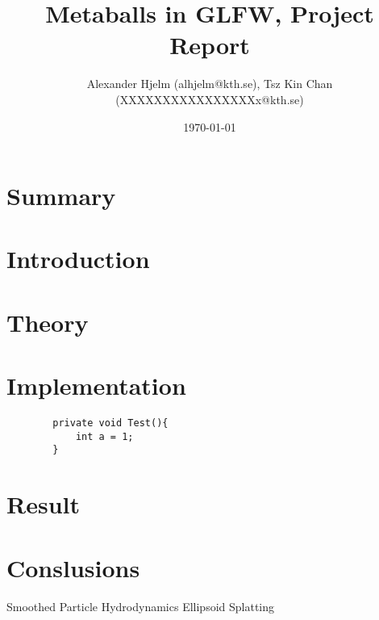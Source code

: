 \documentclass{article}
\title{Metaballs in GLFW, Project Report}
\author{Alexander Hjelm (alhjelm@kth.se), Tsz Kin Chan (XXXXXXXXXXXXXXXXx@kth.se)}
\date{\today}
\begin{document}
    \maketitle

    \section{Summary}
    
    \section{Introduction}

    \section{Theory}

    \section{Implementation}
        \begin{lstlisting}
        private void Test(){
            int a = 1;
        }
        \end{lstlisting}

    \section{Result}

    \section{Conslusions}
    
    Smoothed Particle Hydrodynamics
    Ellipsoid Splatting
\end{document}
